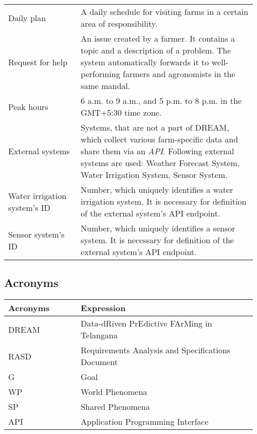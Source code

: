 \begin{center}
\begin{longtable}{@{}p{0.28\linewidth} p{0.68\linewidth}@{}}
        Daily plan              & A daily schedule for visiting farms in a certain area of responsibility.\\
        Request for help        & An issue created by a farmer. It contains a topic and a description of a problem. The system automatically forwards it to well-performing farmers and agronomists in the same mandal.\\
        Peak hours              & 6 a.m. to 9 a.m., and 5 p.m. to 8 p.m. in the GMT+5:30 time zone.\\
        External systems        & Systems, that are not a part of DREAM, which collect various farm-specific data and share them via an \textit{API}. Following external systems are used: Weather Forecast System, Water Irrigation System, Sensor System.\\
        Water irrigation system's ID    & Number, which uniquely identifies a water irrigation system. It is necessary for definition of the external system's API endpoint.  \\
        Sensor system's ID              & Number, which uniquely identifies a sensor system. It is necessary for definition of the external system's API endpoint. \\
	\end{longtable}
\end{center}

\subsection{Acronyms}

\begin{center}
	\begin{tabular}{@{}p{0.28\linewidth} p{0.68\linewidth}@{}}
		\toprule
		\textbf{Acronyms}   & \textbf{Expression}\\
		\midrule
		DREAM               & Data-dRiven PrEdictive FArMing in Telangana\\
		RASD                & Requirements Analysis and Specifications Document\\
		G                   & Goal\\
		WP                  & World Phenomena\\
		SP                  & Shared Phenomena\\
		API                 & Application Programming Interface\\
		\bottomrule
	\end{tabular}
\end{center}

